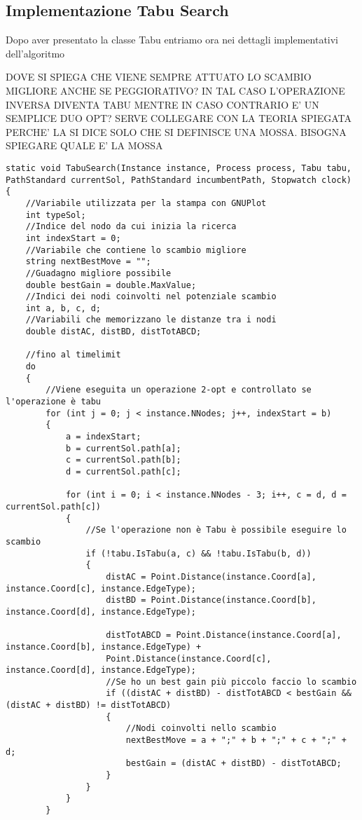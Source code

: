 \subsection{Implementazione Tabu Search}

Dopo aver presentato la classe Tabu entriamo ora nei dettagli implementativi dell'algoritmo

DOVE SI SPIEGA CHE VIENE SEMPRE ATTUATO LO SCAMBIO MIGLIORE ANCHE SE PEGGIORATIVO? IN TAL CASO L'OPERAZIONE INVERSA DIVENTA TABU MENTRE IN CASO CONTRARIO E' UN SEMPLICE DUO OPT?
SERVE COLLEGARE CON LA TEORIA SPIEGATA PERCHE' LA SI DICE SOLO CHE SI DEFINISCE UNA MOSSA. BISOGNA SPIEGARE QUALE E' LA MOSSA

\begin{lstlisting}
static void TabuSearch(Instance instance, Process process, Tabu tabu, PathStandard currentSol, PathStandard incumbentPath, Stopwatch clock)
{
    //Variabile utilizzata per la stampa con GNUPlot
    int typeSol;
    //Indice del nodo da cui inizia la ricerca
    int indexStart = 0;
    //Variabile che contiene lo scambio migliore
    string nextBestMove = "";
    //Guadagno migliore possibile
    double bestGain = double.MaxValue;
    //Indici dei nodi coinvolti nel potenziale scambio
    int a, b, c, d;
    //Variabili che memorizzano le distanze tra i nodi
    double distAC, distBD, distTotABCD;
    
    //fino al timelimit
    do
    {
        //Viene eseguita un operazione 2-opt e controllato se l'operazione è tabu
        for (int j = 0; j < instance.NNodes; j++, indexStart = b)
        {
            a = indexStart;
            b = currentSol.path[a];
            c = currentSol.path[b];
            d = currentSol.path[c];
            
            for (int i = 0; i < instance.NNodes - 3; i++, c = d, d = currentSol.path[c])
            {
                //Se l'operazione non è Tabu è possibile eseguire lo scambio
                if (!tabu.IsTabu(a, c) && !tabu.IsTabu(b, d))
                {
                    distAC = Point.Distance(instance.Coord[a], instance.Coord[c], instance.EdgeType);
                    distBD = Point.Distance(instance.Coord[b], instance.Coord[d], instance.EdgeType);
                    
                    distTotABCD = Point.Distance(instance.Coord[a], instance.Coord[b], instance.EdgeType) +
                    Point.Distance(instance.Coord[c], instance.Coord[d], instance.EdgeType);
                    //Se ho un best gain più piccolo faccio lo scambio
                    if ((distAC + distBD) - distTotABCD < bestGain && (distAC + distBD) != distTotABCD)
                    {
                        //Nodi coinvolti nello scambio
                        nextBestMove = a + ";" + b + ";" + c + ";" + d;
                        bestGain = (distAC + distBD) - distTotABCD;
                    }
                }
            }
        }
        

\end{lstlisting}
